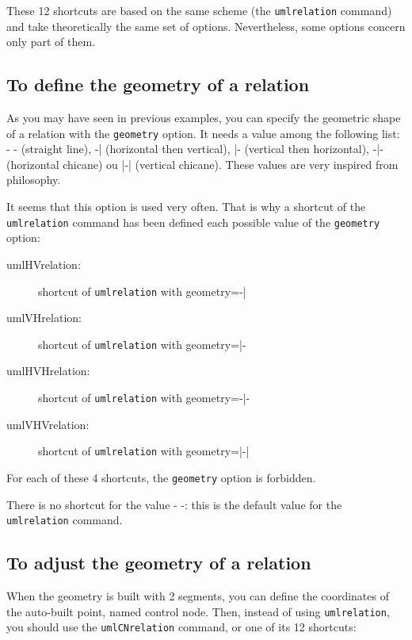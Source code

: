\documentclass[a4paper,11pt]{report}
\begin{document}
These 12 shortcuts are based on the same scheme (the {\tt umlrelation} command) and take theoretically the same set of options. Nevertheless, some options concern only part of them.

\subsection{To define the geometry of a relation}\label{ss.relgeom}

As you may have seen in previous examples, you can specify the geometric shape of a relation
with the \hypertarget{geometry}{{\tt geometry}} option. It needs a value among the following list: - - (straight line), -| (horizontal then vertical), |- (vertical then horizontal), -|- (horizontal chicane) ou |-| (vertical chicane). These values are very inspired from \TikZ philosophy.

It seems that this option is used very often. That is why a shortcut of the {\tt umlrelation} command has been defined each possible value of the {\tt geometry} option:

\begin{description}
	\item[umlHVrelation:] shortcut of {\tt umlrelation} with geometry=-|
	\item[umlVHrelation:] shortcut of {\tt umlrelation} with geometry=|-
	\item[umlHVHrelation:] shortcut of {\tt umlrelation} with geometry=-|-
	\item[umlVHVrelation:] shortcut of {\tt umlrelation} with geometry=|-|
\end{description}

\begin{remark}
	For each of these 4 shortcuts, the {\tt geometry} option is forbidden.
\end{remark}

\begin{remark}
	There is no shortcut for the value - -: this is the default value for the {\tt umlrelation} command.
\end{remark}

\subsection{To adjust the geometry of a relation}\label{ss.relfitgeom}

When the geometry is built with 2 segments, you can define the coordinates of the auto-built point, named control node.
Then, instead of using {\tt umlrelation}, you should use the {\tt umlCNrelation} command, or one of its 12 shortcuts:
\end{document}
